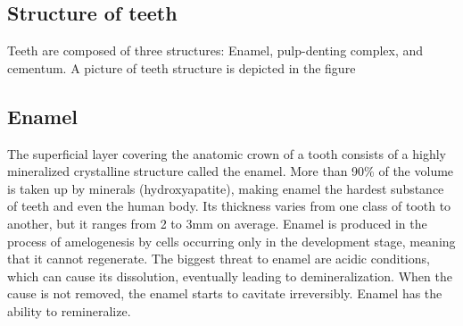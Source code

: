 \subsection{Structure of teeth}
Teeth are composed of three structures: Enamel, pulp-denting complex, and cementum. A picture of teeth structure is depicted in the figure

\subsection*{Enamel}
The superficial layer covering the anatomic crown of a tooth consists of a highly mineralized crystalline structure called the enamel. More than 90\% of the volume is taken up by minerals (hydroxyapatite), making enamel the hardest substance of teeth and even the human body. Its thickness varies from one class of tooth to another, but it ranges from 2 to 3mm on average. Enamel is produced in the process of amelogenesis by cells occurring only in the development stage, meaning that it cannot regenerate. The biggest threat to enamel are acidic conditions, which can cause its dissolution, eventually leading to demineralization. When the cause is not removed, the enamel starts to cavitate irreversibly. Enamel has the ability to remineralize.

